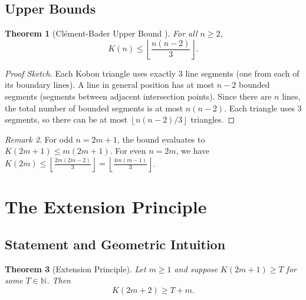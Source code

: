 \documentclass[11pt,a4paper]{article}
\theoremstyle{plain}
\newtheorem{theorem}{Theorem}[section]
\theoremstyle{definition}
\theoremstyle{remark}
\newtheorem{remark}[theorem]{Remark}
\newcommand{\K}{K}
\newcommand{\N}{\mathbb{N}}
\newcommand{\floor}[1]{\left\lfloor #1 \right\rfloor}
\begin{document}
\subsection{Upper Bounds}

\begin{theorem}[Clément-Bader Upper Bound {\cite{clement2007}}]
\label{thm:upper-bound}
For all $n \geq 2$,
\[
\K(n) \leq \floor{\frac{n(n-2)}{3}}.
\]
\end{theorem}

\begin{proof}[Proof Sketch]
Each Kobon triangle uses exactly 3 line segments (one from each of its boundary lines). A line in general position has at most $n-2$ bounded segments (segments between adjacent intersection points). Since there are $n$ lines, the total number of bounded segments is at most $n(n-2)$. Each triangle uses 3 segments, so there can be at most $\floor{n(n-2)/3}$ triangles.
\end{proof}

\begin{remark}
For odd $n = 2m + 1$, the bound evaluates to $\K(2m+1) \leq m(2m+1)$. For even $n = 2m$, we have $\K(2m) \leq \floor{\frac{2m(2m-2)}{3}} = \floor{\frac{4m(m-1)}{3}}$.
\end{remark}

\section{The Extension Principle}

\subsection{Statement and Geometric Intuition}

\begin{theorem}[Extension Principle]
\label{thm:extension}
Let $m \geq 1$ and suppose $\K(2m+1) \geq T$ for some $T \in \N$. Then
\[
\K(2m+2) \geq T + m.
\]
\end{theorem}
\end{document}
